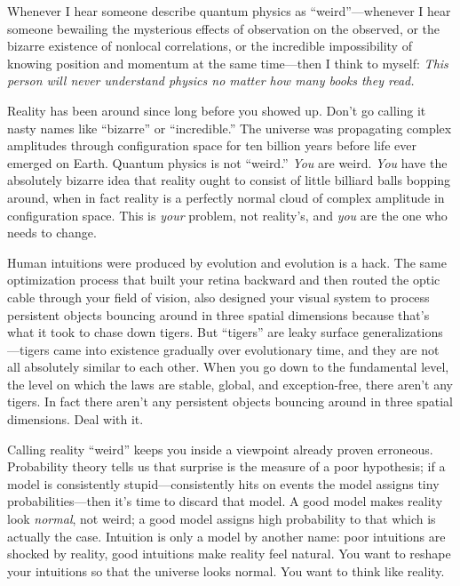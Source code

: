 
{
 Whenever I hear someone describe quantum physics as
``weird''---whenever I hear someone
bewailing the mysterious effects of observation on the observed, or the
bizarre existence of nonlocal correlations, or the incredible
impossibility of knowing position and momentum at the same time---then
I think to myself: \textit{This person will never understand physics no
matter how many books they read.} }

{
 Reality has been around since long before you showed up.
Don't go calling it nasty names like
``bizarre'' or
``incredible.'' The universe was
propagating complex amplitudes through configuration space for ten
billion years before life ever emerged on Earth. Quantum physics is not
``weird.'' \textit{You} are weird.
\textit{You} have the absolutely bizarre idea that reality ought to
consist of little billiard balls bopping around, when in fact reality
is a perfectly normal cloud of complex amplitude in configuration
space. This is \textit{your} problem, not reality's,
and \textit{you} are the one who needs to change.}

{
 Human intuitions were produced by evolution and evolution is a
hack. The same optimization process that built your retina backward and
then routed the optic cable through your field of vision, also designed
your visual system to process persistent objects bouncing around in
three spatial dimensions because that's what it took to
chase down tigers. But ``tigers''
are leaky surface generalizations---tigers came into existence
gradually over evolutionary time, and they are not all absolutely
similar to each other. When you go down to the fundamental level, the
level on which the laws are stable, global, and exception-free, there
aren't any tigers. In fact there aren't
any persistent objects bouncing around in three spatial dimensions.
Deal with it.}

{
 Calling reality ``weird'' keeps
you inside a viewpoint already proven erroneous. Probability theory
tells us that surprise is the measure of a poor hypothesis; if a model
is consistently stupid---consistently hits on events the model assigns
tiny probabilities---then it's time to discard that
model. A good model makes reality look \textit{normal}, not weird; a
good model assigns high probability to that which is actually the case.
Intuition is only a model by another name: poor intuitions are shocked
by reality, good intuitions make reality feel natural. You want to
reshape your intuitions so that the universe looks normal. You want to
think like reality.}

